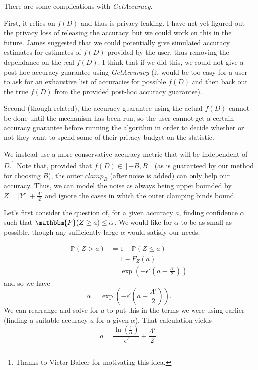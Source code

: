 \documentclass[11pt]{scrartcl} %
\begin{document}
There are some complications with \emph{GetAccuracy}. \newline

First, it relies on $f(D)$ and thus is privacy-leaking. I have not yet figured out the privacy loss of releasing the accuracy,
but we could work on this in the future. James suggested that we could potentially give simulated accuracy estimates
for estimates of $f(D)$ provided by the user, thus removing the dependance on the real $f(D)$.
I think that if we did this, we could not give a post-hoc accuracy guarantee using \emph{GetAccuracy}
(it would be too easy for a user to ask for an exhaustive list of accuracies for possible $f(D)$ and then back out the true
$f(D)$ from the provided post-hoc accuracy guarantee). \newline

Second (though related), the accuracy guarantee using the actual $f(D)$ cannot be done until the mechanism has been run,
so the user cannot get a certain accuracy guarantee before running the algorithm in order to decide whether or
not they want to spend some of their privacy budget on the statistic. \newline

We instead use a more conservative accuracy metric that will be independent of $D$.\footnote{Thanks to Victor Balcer for motivating
this idea.} Note that, provided that $f(D) \in [-B, B]$ (as is guaranteed by our method for choosing $B$),
the outer $clamp_B$ (after noise is added) can only help our accuracy. Thus, we can model the noise as always being upper bounded by
$Z = \vert Y' \vert + \frac{\Lambda'}{2}$ and ignore the cases in which the outer clamping binds bound. \newline

Let's first consider the question of, for a given accuracy $a$, finding confidence $\alpha$ such that
$\mathbbm{P}(Z \geq a) \leq \alpha$. We would like for $\alpha$ to be as small as possible, though any sufficiently large
$\alpha$ would satisfy our needs.

\begin{align*}
	\mathbb{P}(Z > a) &= 1 - \mathbb{P}(Z \leq a) \\
	                  &= 1 - F_{Z}(a) \\
	                  &= \exp\left( -\epsilon'(a - \frac{\Lambda'}{2}) \right)
\end{align*}
and so we have
\[ \alpha = \exp\left( -\epsilon'(a - \frac{\Lambda'}{2}) \right). \]
We can rearrange and solve for $a$ to put this in the terms we were using earlier (finding a suitable accuracy $a$ for
a given $\alpha$). That calculation yields
\[ a = \frac{\ln \left( \frac{1}{\alpha} \right)}{\epsilon'} + \frac{\Lambda'}{2}. \]
\end{document}
